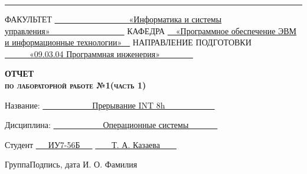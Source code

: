 \begin{titlepage}
\noindent\rule{18cm}{1.5pt}

\vspace{8mm}

\noindent\textnormal{ФАКУЛЬТЕТ}\hspace{5mm} \underline{\textnormal{~~~~~~~~~~~~~~~~~~«Информатика и системы управления»~~~~~~~~~~~~~~~~~~}} \newline\newline
\textnormal{КАФЕДРА}\hspace{5mm} \underline{\textnormal{~~«Программное обеспечение ЭВМ и информационные технологии»~~}}
\newline\newline
\textnormal{НАПРАВЛЕНИЕ ПОДГОТОВКИ}\hspace{5mm} \underline{\textnormal{~~~~~~«09.03.04 Программная инженерия»~~~~~~~~}}

\vspace{2.5cm}

\begin{center}
	\Large\textbf{\textsc{ОТЧЕТ}}\\
	\Large\textbf{\textsc{по лабораторной работе №1(часть 1)}}\\
\end{center}

\vspace{1cm}

\noindent\textnormal{Название:} \hspace{15mm} \underline{\textnormal{~~~~~~~~~~~~Прерывание INT 8h~~~~~~~~~~~~}}\noindent

\vspace{1.3cm}

\noindent\textnormal{Дисциплина:} \hspace{10mm} \underline{\textnormal{~~~~~~~~~~~~Операционные системы~~~~~~~}}\noindent

\vspace{2cm}

\noindent\textnormal{Студент} \hspace{17mm}
\underline{\textnormal{{~~~ИУ7-56Б~~~}}}
\hspace{20mm}
\underline{\textnormal{\hphantom{~~~~~~~~~~~~~~~~~~~~~~~~~~~}}} \hspace{15mm}
\underline{\textnormal{~~~~Т. А. Казаева~~~~}}

\vspace{2mm}
\noindent\textnormal{\hphantom{Студент}} \hspace{23mm}\noindent
\fontsize{8pt}{8pt}
\textnormal{Группа}\hspace{40mm}\textnormal{Подпись, дата} \hspace{30mm}\noindent\textnormal{И. О. Фамилия}


\end{titlepage}
